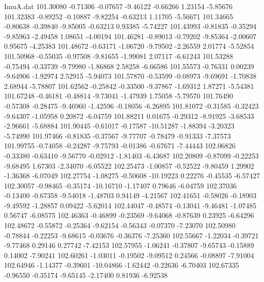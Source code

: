 \begin{filecontents}{ImuA.dat}
 101.30080   -0.71306   -0.07657   -9.46122   -0.66266    1.23154   -5.85676
 101.32383   -0.89252   -0.10887   -9.82254   -0.63213    1.11705   -5.56671
 101.34665   -0.80638   -0.39840   -9.85005   -0.63213    0.93385   -5.74227
 101.43993   -0.81835   -0.35294   -9.85963   -2.49458    1.08651   -4.00194
 101.46281   -0.89013   -0.79202   -9.85364   -2.00607    0.95675   -4.25383
 101.48672   -0.63171   -1.06720   -9.79502   -2.26559    2.01774   -5.52854
 101.50968   -0.55035   -0.97508   -9.81655   -1.99081    2.07117   -6.61243
 101.53288   -0.75494   -0.33739   -9.79980   -1.86868    2.58258   -6.66586
 101.55573   -0.76331    0.00239   -9.64906   -1.92974    2.52915   -5.94073
 101.57870   -0.53599   -0.08973   -9.69691   -1.70838    2.68944   -5.78807
 101.62562   -0.25842   -0.33500   -9.37867   -1.69312    1.87271   -5.54381
 101.67248   -0.46181   -0.48814   -9.73041   -1.47939    1.75058   -5.79570
 101.76490   -0.57308   -0.28475   -9.46960   -1.42596   -0.18056   -6.26895
 101.81072   -0.31585   -0.32423   -9.64307   -1.05958    0.20872   -6.04759
 101.88211    0.01675   -0.29312   -8.91925   -3.68533   -2.96661   -5.68884
 101.90445   -0.61017   -0.17587  -10.51287   -1.88394   -3.20323   -5.74990
 101.97466   -0.81835   -0.37567   -9.77707   -0.78479   -0.91333   -7.37573
 101.99755   -0.74058   -0.24287   -9.75793   -0.01386   -0.67671   -7.44443
 102.06826   -0.33380   -0.63410   -9.56770   -0.02912   -1.81403   -6.43687
 102.20809   -0.87099   -0.22253   -9.68495    1.67303   -2.34070   -6.05522
 102.25473   -1.00857   -0.52522   -9.80459    1.29902   -1.36368   -6.07049
 102.27754   -1.08275   -0.50608  -10.19223    0.22276   -0.45535   -6.57427
 102.30057   -0.98465   -0.35174  -10.16710   -1.17407    0.79646   -6.04759
 102.37036   -0.13400   -0.67358   -9.54018   -1.48703    0.94149   -4.21567
 102.41651   -0.58026   -0.18903   -9.49592   -1.28857    0.09422   -5.62014
 102.44047   -0.48574   -0.13041   -9.46481   -1.07485    0.56747   -6.08575
 102.46363   -0.46899   -0.23569   -9.64068   -0.87639    0.23925   -6.64296
 102.48672   -0.55872   -0.25364   -9.62154   -0.56343   -0.07370   -7.23070
 102.50980   -0.78844   -0.22253   -9.68615   -0.03676   -0.36376   -7.25360
 102.55667   -1.22034   -0.39721   -9.77468    0.29146    0.27742   -7.42153
 102.57955   -1.06241   -0.37807   -9.65743   -0.15889    0.14002   -7.90241
 102.60261   -1.03011   -0.19502   -9.09512    0.24566   -0.08897   -7.91004
 102.64946   -1.14377   -0.39601  -10.04866   -1.62442   -0.22636   -6.70403
 102.67335   -0.96550   -0.35174   -9.65145   -2.17400    0.81936   -6.92538

\end{filecontents}
